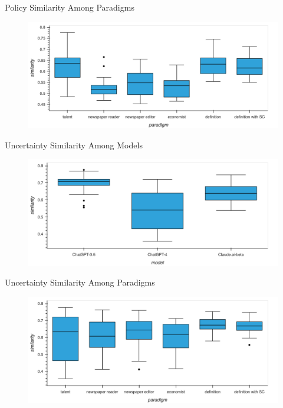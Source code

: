 \documentclass[12pt]{beamer}
\begin{document}
\begin{frame}{Policy Similarity Among Paradigms}
\begin{figure}[H]
\centering
\includegraphics[width=11.5cm]{Figures/fig24.png}
\end{figure}
\end{frame}


\begin{frame}{Uncertainty Similarity Among Models}
\begin{figure}[H]
\centering
\includegraphics[width=11.5cm]{Figures/fig25.png}
\end{figure}
\end{frame}


\begin{frame}{Uncertainty Similarity Among Paradigms}
\begin{figure}[H]
\centering
\includegraphics[width=11.5cm]{Figures/fig26.png}
\end{figure}
\end{frame}
\end{document}
